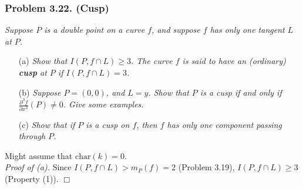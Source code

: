 \documentclass{article}
\begin{document}
\subsubsection*{Problem 3.22. (Cusp)}
\emph{Suppose $P$ is a double point on a curve $f$,
and suppose $f$ has only one tangent $L$ at $P$.}
\begin{enumerate}
\item[(a)]
  \emph{Show that $I(P, f \cap L) \geq 3$.
  The curve $f$ is said to have an (ordinary) \textbf{cusp} at $P$ if $I(P, f \cap L) = 3$.}

\item[(b)]
  \emph{Suppose $P = (0,0)$, and $L = y$.
  Show that $P$ is a cusp if and only if
  $\frac{\partial^3 f}{\partial x^3}(P) \neq 0$. Give some examples.}

\item[(c)]
  \emph{Show that if $P$ is a cusp on $f$,
  then $f$ has only one component passing through $P$.} \\
\end{enumerate}



Might assume that $\mathrm{char}(k) = 0$. \\



\emph{Proof of (a).}
  Since $I(P, f \cap L) > m_P(f) = 2$ (Problem 3.19),
  $I(P, f \cap L) \geq 3$ (Property (1)).
$\Box$ \\
\end{document}
